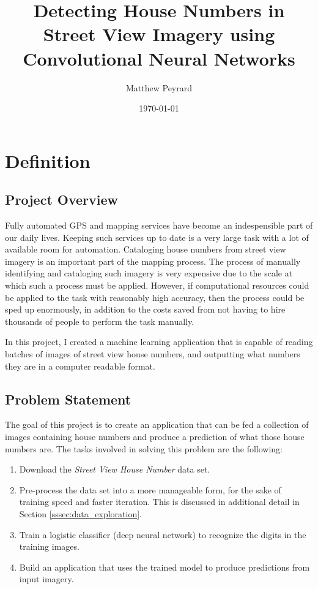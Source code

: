 \documentclass[12pt]{article}
\title{Detecting House Numbers in Street View Imagery using Convolutional Neural Networks}
\author{Matthew Peyrard}
\date{\today}
\begin{document}
\maketitle

\section{Definition}
\subsection{Project Overview}
Fully automated GPS and mapping services have become an indespensible part of our daily lives.
Keeping such services up to date is a very large task with a lot of available room for automation.
Cataloging house numbers from street view imagery is an important part of the mapping process.
The process of manually identifying and cataloging such imagery is very expensive due to the scale at which such a process must be applied.
However, if computational resources could be applied to the task with reasonably high accuracy, then the process could be sped up enormously, in addition to the costs saved from not having to hire thousands of people to perform the task manually.

In this project, I created a machine learning application that is capable of reading batches of images of street view house numbers, and outputting what numbers they are in a computer readable format.

\subsection{Problem Statement}
The goal of this project is to create an application that can be fed a collection of images containing house numbers and produce a prediction of what those house numbers are.
The tasks involved in solving this problem are the following:

\begin{enumerate}
	\item Download the \textit{Street View House Number} data set\cite{svhn_dataset}.
	\item Pre-process the data set into a more manageable form, for the sake of training speed and faster iteration. This is discussed in additional detail in Section \ref{sssec:data_exploration}.
	\item Train a logistic classifier (deep neural network) to recognize the digits in the training images.
	\item Build an application that uses the trained model to produce predictions from input imagery.
\end{enumerate}
\end{document}
